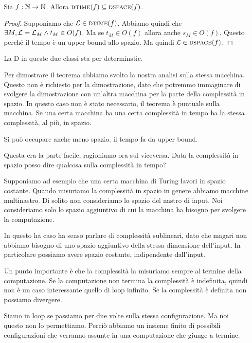 \begin{thm}
    Sia $f: \mathbb{N} \to \mathbb{N}$. Allora $\textsc{dtime}(f) \subseteq \textsc{dspace}(f)$.
\end{thm}
\begin{proof}
    Supponiamo che $\mathcal{L} \in \textsc{dtime}(f)$. Abbiamo quindi che $\exists M, \mathcal{L} = \mathcal{L}_{M} \land
    t_{M} \in O(f)$. Ma se $t_{M} \in O(f)$ allora anche $s_{M} \in O(f)$. Questo perché il tempo
    è un upper bound allo spazio. Ma quindi $\mathcal{L} \in \textsc{dspace}(f)$.
\end{proof}

La D in queste due classi sta per determinstic.

Per dimostrare il teorema abbiamo svolto la nostra analisi sulla stessa macchina. Questo non è
richiesto per la dimostrazione, dato che potremmo immaginare di svolgere la dimostrazione con
un'altra macchina per la parte della complessità in spazio. In questo caso non è stato necessario,
il teorema è puntuale sulla macchina. Se una certa macchina ha una certa complessità in tempo ha la
stessa complessità, al più, in spazio.

Si può occupare anche meno spazio, il tempo fa da upper bound.

Questa era la parte facile, ragioniamo ora sul viceversa. Data la complessità in spazio posso dire
qualcosa sulla complessità in tempo?

Supponiamo ad esempio che una certa macchina di Turing lavori in spazio costante. Quando misuriamo
la complessità in spazio in genere abbiamo macchine multinastro. Di solito non consideriamo lo
spazio del nastro di input. Noi consideriamo solo lo spazio aggiuntivo di cui la macchina ha bisogno
per svolgere la computazione.

In questo ha caso ha senso parlare di complessità sublineari, dato che magari non abbiamo bisogno
di uno spazio aggiuntivo della stessa dimensione dell'input. In particolare possiamo avere spazio
costante, indipendente dall'input.

Un punto importante è che la complessità la misuriamo sempre al termine della computazione. Se la
computazione non termina la complessità è indefinita, quindi non è un caso interessante quello di
loop infinito. Se la complessità è definita non possiamo divergere.

Siamo in loop se passiamo per due volte sulla stessa configurazione. Ma noi questo non lo
permettiamo. Perciò abbiamo un insieme finito di possibili configurazioni che verranno assunte in
una computazione che giunge a termine.

